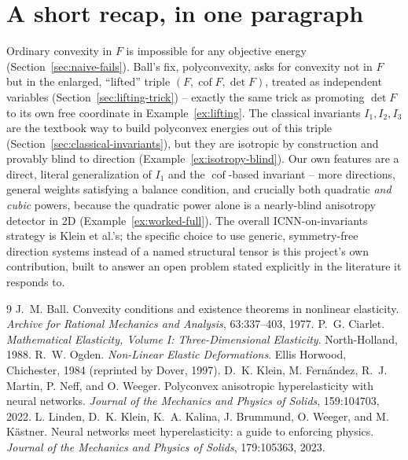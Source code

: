 \documentclass[11pt,a4paper]{article}
\newcommand{\Cof}{\operatorname{cof}}
\begin{document}
\section{A short recap, in one paragraph}
\label{sec:recap}

Ordinary convexity in $F$ is impossible for any objective energy
(Section~\ref{sec:naive-fails}). Ball's fix, polyconvexity, asks for
convexity not in $F$ but in the enlarged, ``lifted'' triple
$(F,\Cof F,\det F)$, treated as independent variables
(Section~\ref{sec:lifting-trick}) -- exactly the same trick as
promoting $\det F$ to its own free coordinate in
Example~\ref{ex:lifting}. The classical invariants $I_1,I_2,I_3$ are
the textbook way to build polyconvex energies out of this triple
(Section~\ref{sec:classical-invariants}), but they are isotropic by
construction and provably blind to direction
(Example~\ref{ex:isotropy-blind}). Our own features are a direct,
literal generalization of $I_1$ and the $\Cof$-based invariant --
more directions, general weights satisfying a balance condition, and
crucially both quadratic \emph{and cubic} powers, because the quadratic
power alone is a nearly-blind anisotropy detector in 2D
(Example~\ref{ex:worked-full}). The overall ICNN-on-invariants strategy
is Klein et al.'s; the specific choice to use generic, symmetry-free
direction systems instead of a named structural tensor is this
project's own contribution, built to answer an open problem stated
explicitly in the literature it responds to.

\begin{thebibliography}{9}
J.~M. Ball. Convexity conditions and existence theorems in nonlinear
elasticity. \emph{Archive for Rational Mechanics and Analysis}, 63:337--403,
1977.
P.~G. Ciarlet. \emph{Mathematical Elasticity, Volume I: Three-Dimensional
Elasticity}. North-Holland, 1988.
R.~W. Ogden. \emph{Non-Linear Elastic Deformations}. Ellis Horwood,
Chichester, 1984 (reprinted by Dover, 1997).
D.~K. Klein, M. Fern\'andez, R.~J. Martin, P. Neff, and O. Weeger.
Polyconvex anisotropic hyperelasticity with neural networks.
\emph{Journal of the Mechanics and Physics of Solids}, 159:104703, 2022.
L. Linden, D.~K. Klein, K.~A. Kalina, J. Brummund, O. Weeger, and
M. K\"astner. Neural networks meet hyperelasticity: a guide to enforcing
physics. \emph{Journal of the Mechanics and Physics of Solids},
179:105363, 2023.
\end{thebibliography}
\end{document}
